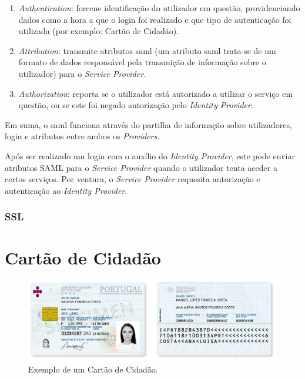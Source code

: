 \begin{enumerate}
    \item \emph{Authentication}: forcene identificação do utilizador em questão, providenciando dados como a hora a que o login foi realizado e que tipo de autenticação foi utilizada (por exemplo: Cartão de Cidadão).
    \item \emph{Attribution}: transmite atributos \gls{saml} (um atributo \gls{saml} trata-se de um formato de dados responsável pela transmição de informação sobre o utilizador) para o \emph{Service Provider}.
    \item \emph{Authorization}: reporta se o utilizador está autorizado a utilizar o serviço em questão, ou se este foi negado autorização pelo \emph{Identity Provider}.
\end{enumerate}

Em suma, o \gls{saml} funciona através do partilha de informação sobre utilizadores, login e atributos entre ambos os \emph{Providers}. 

Após ser realizado um login com o auxílio do \emph{Identity Provider}, este pode enviar atributos SAML para o \emph{Service Provider} quando o utilizador tenta aceder a certos serviços. Por ventura, o \emph{Service Provider} requesita autorização e autenticação ao \emph{Identity Provider}.

\newpage
\subsubsection{SSL} \label{ssl_section}

\newpage
\section{Cartão de Cidadão}

\begin{figure}[h]
    \centering
    \includegraphics[width=\textwidth]{img/cc/CartaoCidadao.png}
    \caption{Exemplo de um Cartão de Cidadão\cite{ccPic}.}
\end{figure}

